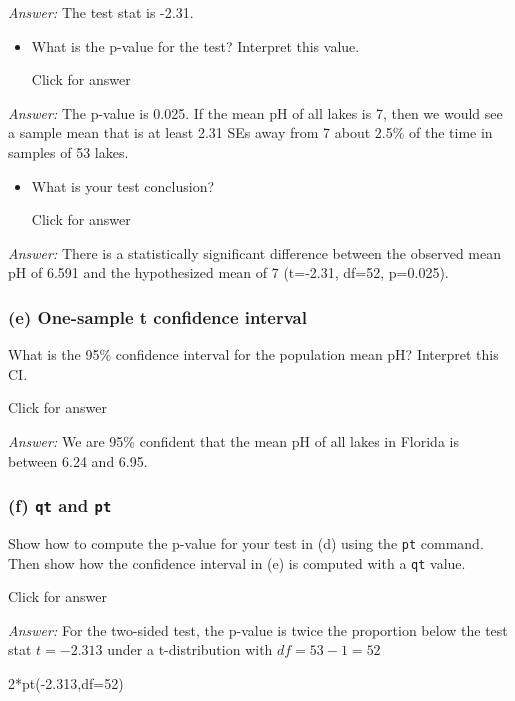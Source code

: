 \documentclass[
]{book}
\newenvironment{Shaded}{\begin{snugshade}}{\end{snugshade}}
\newcommand{\AttributeTok}[1]{\textcolor[rgb]{0.77,0.63,0.00}{#1}}
\newcommand{\DecValTok}[1]{\textcolor[rgb]{0.00,0.00,0.81}{#1}}
\newcommand{\FloatTok}[1]{\textcolor[rgb]{0.00,0.00,0.81}{#1}}
\newcommand{\FunctionTok}[1]{\textcolor[rgb]{0.00,0.00,0.00}{#1}}
\newcommand{\NormalTok}[1]{#1}
\newcommand{\SpecialCharTok}[1]{\textcolor[rgb]{0.00,0.00,0.00}{#1}}
\providecommand{\tightlist}{%
  \setlength{\itemsep}{0pt}\setlength{\parskip}{0pt}}
\begin{document}
\emph{Answer:} The test stat is -2.31.

\begin{itemize}
\tightlist
\item
  What is the p-value for the test? Interpret this value.

  Click for answer
\end{itemize}

\emph{Answer:} The p-value is 0.025. If the mean pH of all lakes is 7, then we would see a sample mean that is at least 2.31 SEs away from 7 about 2.5\% of the time in samples of 53 lakes.

\begin{itemize}
\tightlist
\item
  What is your test conclusion?

  Click for answer
\end{itemize}

\emph{Answer:} There is a statistically significant difference between the observed mean pH of 6.591 and the hypothesized mean of 7 (t=-2.31, df=52, p=0.025).

\hypertarget{e-one-sample-t-confidence-interval}{%
\subsubsection{(e) One-sample t confidence interval}\label{e-one-sample-t-confidence-interval}}

What is the 95\% confidence interval for the population mean pH? Interpret this CI.

Click for answer

\emph{Answer:} We are 95\% confident that the mean pH of all lakes in Florida is between 6.24 and 6.95.

\hypertarget{f-qt-and-pt}{%
\subsubsection{\texorpdfstring{(f) \texttt{qt} and \texttt{pt}}{(f) qt and pt}}\label{f-qt-and-pt}}

Show how to compute the p-value for your test in (d) using the \texttt{pt} command. Then show how the confidence interval in (e) is computed with a \texttt{qt} value.

Click for answer

\emph{Answer:} For the two-sided test, the p-value is twice the proportion below the test stat \(t=-2.313\) under a t-distribution with \(df=53-1=52\)

\begin{Shaded}
\begin{Highlighting}[]
\DecValTok{2}\SpecialCharTok{*}\FunctionTok{pt}\NormalTok{(}\SpecialCharTok{{-}}\FloatTok{2.313}\NormalTok{,}\AttributeTok{df=}\DecValTok{52}\NormalTok{)}
\end{Highlighting}
\end{Shaded}
\end{document}
